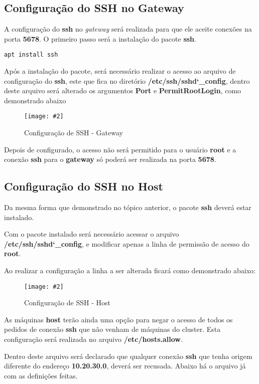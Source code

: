 \documentclass[
	12pt,				%
	openany,			%
	a4paper,			%
	chapter=TITLE,		%
	section=TITLE,		%
	english,
	brazil				%
]{abntex2}
\newcommand{\includeImage}[3] {

\begin{figure}[H]
 	 \centering
  		\texttt{[image: \#2]}
  	\caption{#3}
\end{figure}

}
\begin{document}
\subsection{Configuração do SSH no Gateway}

A configuração do \textbf{ssh} no \textit{gateway} será realizada para que ele aceite conexões na porta \textbf{5678}. O primeiro passo será a instalação do pacote \textbf{ssh}.

\begin{lstlisting}
apt install ssh
\end{lstlisting}

Após a instalação do pacote, será necessário realizar o acesso ao arquivo de configuração do \textbf{ssh}, este que fica no diretório \textbf{/etc/ssh/sshd\char`_config}, dentro deste arquivo será alterado os argumentos \textbf{Port} e \textbf{PermitRootLogin}, como demonstrado abaixo 

\includeImage{0.7}{imgs/4_configuracao_servicos_rede/1_gateway_1.png}{Configuração de SSH - Gateway}

Depois de configurado, o acesso não será permitido para o usuário \textbf{root} e a conexão \textbf{ssh} para o \textbf{gateway} só poderá ser realizada na porta \textbf{5678}.

\subsection{Configuração do SSH no Host}

Da mesma forma que demonstrado no tópico anterior, o pacote \textbf{ssh} deverá estar instalado.

Com o pacote instalado será necessário acessar o arquivo \textbf{/etc/ssh/sshd\char`_config}, e modificar apenas a linha de permissão de acesso do \textbf{root}. 

Ao realizar a configuração a linha a ser alterada ficará como demonstrado abaixo:
\includeImage{0.5}{imgs/4_configuracao_servicos_rede/1_host_1.png}{Configuração de SSH - Host}

As máquinas \textbf{host} terão ainda uma opção para negar o acesso de todos os pedidos de conexão \textbf{ssh} que não venham de máquinas do cluster. Esta configuração será realizada no arquivo \textbf{/etc/hosts.allow}.

Dentro deste arquivo será declarado que qualquer conexão \textbf{ssh} que tenha origem diferente do endereço \textbf{10.20.30.0}, deverá ser recusada. Abaixo há o arquivo já com as definições feitas.
\end{document}
